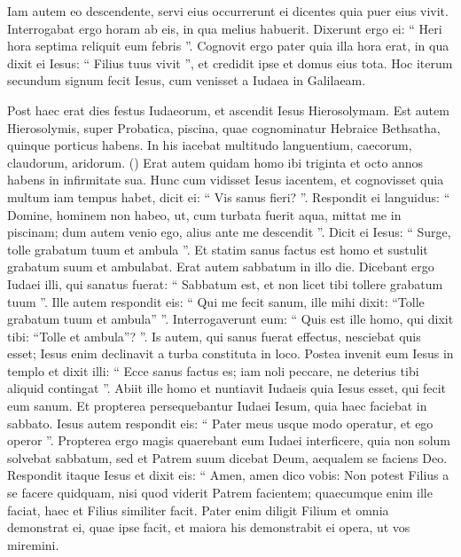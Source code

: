 \begin{biblechapter}
\begin{biblechapter}
\begin{biblechapter}
\begin{biblechapter}
\verse Iam autem eo descendente, servi eius occurrerunt ei dicentes quia puer eius vivit. 
\verse Interrogabat ergo horam ab eis, in qua melius habuerit. Dixerunt ergo ei: “ Heri hora septima reliquit eum febris ”. 
\verse Cognovit ergo pater quia illa hora erat, in qua dixit ei Iesus: “ Filius tuus vivit ”, et credidit ipse et domus eius tota. 
\verse Hoc iterum secundum signum fecit Iesus, cum venisset a Iudaea in Galilaeam. 
\begin{biblechapter}
\verse Post haec erat dies festus Iudaeorum, et ascendit Iesus Hierosolymam. 
\verse Est autem Hierosolymis, super Probatica, piscina, quae cognominatur Hebraice
 Bethsatha, quinque porticus habens. 
\verse In his iacebat multitudo languentium, caecorum, claudorum, aridorum. 
(\verse) \verse Erat autem quidam homo ibi triginta et octo annos habens in infirmitate sua. 
\verse Hunc cum vidisset Iesus iacentem, et cognovisset quia multum iam tempus habet, dicit ei: “ Vis sanus fieri? ”. 
\verse Respondit ei languidus: “ Domine, hominem non habeo, ut, cum turbata fuerit aqua, mittat me in piscinam; dum autem venio ego, alius ante me descendit ”. 
 \verse Dicit ei Iesus: “ Surge, tolle grabatum tuum et ambula ”. 
\verse Et statim sanus factus est homo et sustulit grabatum suum et ambulabat.
 Erat autem sabbatum in illo die. 
\verse Dicebant ergo Iudaei illi, qui sanatus fuerat: “ Sabbatum est, et non licet tibi tollere grabatum tuum ”. 
\verse Ille autem respondit eis: “ Qui me fecit sanum, ille mihi dixit: “Tolle grabatum tuum et ambula” ”. 
\verse Interrogaverunt eum: “ Quis est ille homo, qui dixit tibi: “Tolle et ambula”? ”. 
\verse Is autem, qui sanus fuerat effectus, nesciebat quis esset; Iesus enim declinavit a turba constituta in loco. 
\verse Postea invenit eum Iesus in templo et dixit illi: “ Ecce sanus factus es; iam noli peccare, ne deterius tibi aliquid contingat ”. 
\verse Abiit ille homo et nuntiavit Iudaeis quia Iesus esset, qui fecit eum sanum. 
\verse Et propterea persequebantur Iudaei Iesum, quia haec faciebat in sabbato. 
\verse Iesus autem respondit eis: “ Pater meus usque modo operatur, et ego operor ”. 
\verse Propterea ergo magis quaerebant eum Iudaei interficere, quia non solum solvebat sabbatum, sed et Patrem suum dicebat Deum, aequalem se faciens Deo.
 \verse Respondit itaque Iesus et dixit eis: “ Amen, amen dico vobis: Non potest Filius a se facere quidquam, nisi quod viderit Patrem facientem; quaecumque enim ille faciat, haec et Filius similiter facit. 
\verse Pater enim diligit Filium et omnia demonstrat ei, quae ipse facit, et maiora his demonstrabit ei opera, ut vos miremini. 

\end{biblechapter}
\end{biblechapter}
\end{biblechapter}
\end{biblechapter}
\end{biblechapter}
